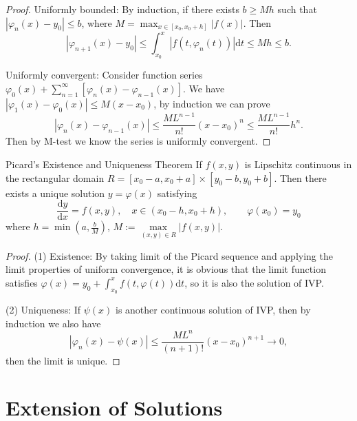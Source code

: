 \begin{proof}
  Uniformly bounded: By induction, if there exists $b \geq Mh$ such that $|\varphi_n(x) - y_0| \leq b$,
  where $M = \max _{x \in [x_0, x_0 + h]}|f(x)|$. Then
  \begin{equation}
    |\varphi_{n+1}(x) - y_0| \leq \int_{x_0}^x |f(t, \varphi_n(t))|\mathrm{d} t
    \leq M h \leq b.
  \end{equation}

  Uniformly convergent: Consider function series
  $\varphi_0(x) + \sum\limits_{n = 1}^{\infty}[\varphi_n(x) - \varphi_{n-1}(x)]$.
  We have $|\varphi_1(x) - \varphi_0(x)| \leq M(x-x_0)$, by induction we can prove
  \begin{equation}
    |\varphi_n(x) - \varphi_{n-1}(x)| \leq \frac{ML^{n-1}}{n!}(x-x_0)^n \leq \frac{ML^{n-1}}{n!}h^n.
  \end{equation}
  Then by M-test we know the series is uniformly convergent.
\end{proof}


\begin{theorem}{Picard's Existence and Uniqueness Theorem}{}
  If $f(x,y)$ is Lipschitz continuous in
  the rectangular domain $R = [x_0-a,x_0+a] \times [y_0-b, y_0 + b]$.
  Then there exists a unique solution $y = \varphi(x)$ satisfying
  \begin{equation}
    \frac{\mathrm{d} y}{\mathrm{d} x} = f(x,y), \quad x\in (x_0 -h, x_0 + h),
    \quad \quad \varphi(x_0) = y_0
  \end{equation}
  where $h = \min \left( a, \frac{b}{M} \right)$, $M := \max \limits_{(x,y) \in R}|f(x,y)|$.
\end{theorem}

\begin{proof}
  (1) Existence: By taking limit of the Picard sequence
  and applying the limit properties of uniform convergence,
  it is obvious that the limit function satisfies
  $\varphi(x) = y_0 + \int_{x_0}^x f(t,\varphi(t))\mathrm{d} t$,
  so it is also the solution of IVP.

  (2) Uniqueness: If $\psi(x)$ is another continuous solution of IVP,
  then by induction we also have
  \begin{equation}
    |\varphi_n(x) - \psi(x)| \leq \frac{M L^n}{(n+1)!}(x-x_0)^{n+1} \rightarrow 0,
  \end{equation}
  then the limit is unique.
\end{proof}

\section{Extension of Solutions}

